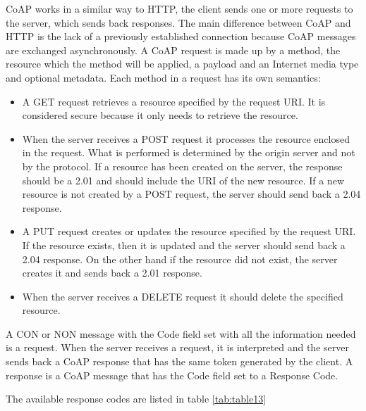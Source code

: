 	CoAP works in a similar way to HTTP, the client sends one or more requests to the server, which sends back responses.\newline
	The main difference between CoAP and HTTP is the lack of a previously established connection because CoAP messages are exchanged asynchronously.\newline
	A CoAP request is made up by a method, the resource which the method will be applied,
	a payload and an Internet media type and optional metadata.\newline
	Each method in a request has its own semantics:
	\begin{itemize}
		\item A GET request retrieves a resource specified by the request URI.
		It is considered secure because it only needs to retrieve the resource.
		
		\item When the server receives a POST request it processes the resource enclosed in the request.
		What is performed is determined by the origin server and not by the protocol.
		If a resource has been created on the server, the response should be a 2.01 and should include the URI of the new resource.
		If a new resource is not created by a POST request, the server should send back a 2.04 response.
		
		\item A PUT request creates or updates the resource specified by the request URI.
		If the resource exists, then it is updated and the server should send back a 2.04 response.
		On the other hand if the resource did not exist, the server creates it and sends back a 2.01 response.
		
		\item When the server receives a DELETE request it should delete the specified resource.
		
	\end{itemize}
	
	A CON or NON message with the Code field set with all the information needed is a request.\newline
	When the server receives a request, it is interpreted and the server sends back a CoAP response that has the same token generated by the client.\newline
	A response is a CoAP message that has the Code field set to a Response Code.\newline

	The available response codes are listed in table \ref{tab:table13}

